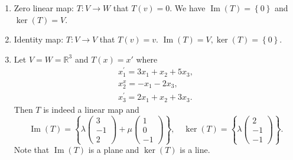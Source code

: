 \documentclass[10pt]{article}
\DeclareMathOperator{\im}{Im}
\begin{document}
    \begin{example}
        \begin{enumerate}[(1)]
            \item Zero linear map: $ T:V\to W $ that $ T(v)=0 $. We have $ \im(T)=\left\{ 0\right\} $ and $ \ker(T)=V $.
            \item Identity map: $ T:V\to V $ that $ T(v)=v $. $ \im(T)=V, \ker(T)=\left\{ 0\right\} $.
            \item Let $ V=W=\mathbb{R}^3 $ and $ T(x)=x' $ where 
            \[
                \begin{array}{l}
                    x_{1}^{\prime}=3 x_{1}+x_{2}+5 x_{3}, \\
                    x_{2}^{x}=-x_{1}-2 x_{3}, \\
                    x_{3}^{\prime}=2 x_{1}+x_{2}+3 x_{3}.
                \end{array}
            \]
            Then $T$ is indeed a linear map and
            \[
                \im(T)=\left\{ \lambda \begin{pmatrix}
                    3\\-1\\2
                \end{pmatrix}+\mu \begin{pmatrix}
                    1\\0\\-1
                \end{pmatrix} \right\},\quad \ker(T)=\left\{ \lambda \begin{pmatrix}
                    2\\-1\\-1
                \end{pmatrix}\right\}
            .\]
            Note that $\im(T)$ is a plane and $\ker(T)$ is a line.
        \end{enumerate}
    \end{example}
\end{document}
